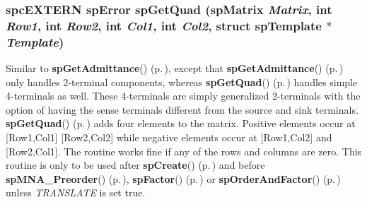 \subsubsection{\setlength{\rightskip}{0pt plus 5cm}spc\-EXTERN {\bf sp\-Error} sp\-Get\-Quad ({\bf sp\-Matrix} {\em Matrix}, int {\em Row1}, int {\em Row2}, int {\em Col1}, int {\em Col2}, struct {\bf sp\-Template} $\ast$ {\em Template})}\label{spMatrix_8h_a39}


Similar to {\bf sp\-Get\-Admittance}() {\rm (p.\,\pageref{spMatrix_8h_a35})}, except that {\bf sp\-Get\-Admittance}() {\rm (p.\,\pageref{spMatrix_8h_a35})} only handles 2-terminal components, whereas {\bf sp\-Get\-Quad}() {\rm (p.\,\pageref{spMatrix_8h_a39})} handles simple 4-terminals as well. These 4-terminals are simply generalized 2-terminals with the option of having the sense terminals different from the source and sink terminals. {\bf sp\-Get\-Quad}() {\rm (p.\,\pageref{spMatrix_8h_a39})} adds four elements to the matrix. Positive elements occur at [Row1,Col1] [Row2,Col2] while negative elements occur at [Row1,Col2] and [Row2,Col1]. The routine works fine if any of the rows and columns are zero. This routine is only to be used after {\bf sp\-Create}() {\rm (p.\,\pageref{spMatrix_8h_a24})} and before {\bf sp\-MNA\_\-Preorder}() {\rm (p.\,\pageref{spMatrix_8h_a44})}, {\bf sp\-Factor}() {\rm (p.\,\pageref{spMatrix_8h_a30})} or {\bf sp\-Order\-And\-Factor}() {\rm (p.\,\pageref{spMatrix_8h_a46})} unless {\em TRANSLATE} is set true.

